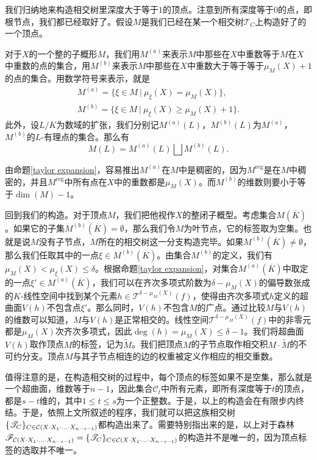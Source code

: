 我们归纳地来构造相交树里深度大于等于$1$的顶点。注意到所有深度等于$0$的点，即根节点，我们都已经取好了。假设$M$是我们已经在某一个相交树$\mathscr T_C$上构造好了的一个顶点。

对于$X$的一个整的子概形$M$，我们用$M^{(a)}$来表示$M$中那些在$X$中重数等于$M$在$X$中重数的点的集合，用$M^{(b)}$来表示$M$中那些在$X$中重数大于等于等于$\mu_M(X)+1$的点的集合。用数学符号来表示，就是
\begin{gather}
M^{(a)} = \{ \xi\in M \ |\ \mu_{\xi}(X) = \mu_{M}(X) \} ,\\
M^{(b)} = \{ \xi\in M \ |\ \mu_{\xi}(X) \geqslant \mu_{M}(X)+1 \}.
\end{gather}
此外，设$L/K$为数域的扩张，我们分别记$M^{(a)}(L)$，$M^{(b)}(L)$为$M^{(a)}$，$M^{(b)}$的$L$-有理点的集合。那么有
\begin{equation}
M(L) = M^{(a)}(L)\bigsqcup M^{(b)}(L).
\end{equation}

由命题\ref{taylor expansion}，容易推出$M^{(a)}$在$M$中是稠密的，因为$M^\mathrm{reg}$是在$M$中稠密的，并且$M^\mathrm{reg}$中所有点在$X$中的重数都是$\mu_M(X)$。而$M^{(b)}$的维数则要小于等于$\dim (M)-1$。

回到我们的构造。对于顶点$M$，我们把他视作$X$的整闭子概型。考虑集合$M(\overline K)$。如果它的子集$M^{(b)}(\overline K)=\emptyset$，那么我们令$M$为叶节点，它的标签取为空集。也就是说$M$没有子节点，$M$所在的相交树这一分支构造完毕。如果$M^{(b)}(\overline K)\neq\emptyset$，那么我们任取其中的一点$\xi \in M^{(b)}(\overline K)$。由集合$M^{(b)}$的定义，我们有$\mu_M(X) < \mu_{\xi}(X) \leqslant \delta$。根据命题\ref{taylor expansion}，对集合$M^{(a)}(\overline K)$中取定的一点$\xi'\in M^{(a)}(\overline K)$，我们可以在齐次多项式阶数为$\delta-\mu_M(X)$的偏导数张成的$K$-线性空间中找到某个元素$h \in \mathcal{T}^{\delta-\mu_M(X)}(f)$，使得由齐次多项式$h$定义的超曲面$V(h)$不包含点$\xi'$。那么同时，$V(h)$不包含$M$的广点。通过比较$M$与$V(h)$的维数可以知道，$M$与$V(h)$是正常相交的。线性空间$\mathcal{T}^{\delta-\mu_M(X)}(f)$中的非零元都是$\mu_M(X)$次齐次多项式，因此$\deg(h) = \mu_M(X) \leqslant \delta-1$。我们将超曲面$V(h)$取作顶点$M$的标签，记为$\widetilde{M}$。我们把顶点$M$的子节点取作相交积$M\cdot\widetilde{M}$的不可约分支。顶点$M$与其子节点相连的边的权重被定义作相应的相交重数。

值得注意的是，在构造相交树的过程中，每个顶点的标签如果不是空集，那么就是一个超曲面，维数等于$n-1$，因此集合$\mathcal{C}_t$中所有元素，即所有深度等于$t$的顶点，都是$s-t$维的，其中$1\leqslant t\leqslant s$为一个正整数。于是，以上的构造会在有限步内终结。于是，依照上文所叙述的程序，我们就可以把这族相交树$\{\mathscr T_C\}_{C\in\mathcal C(X\cdot X_{1}\cdot\ldots\cdot X_{n-s-1})}$都构造出来了。需要特别指出来的是，以上对于森林$\mathscr{F}_{\mathcal C(X\cdot X_{1}\cdot\ldots\cdot X_{n-s-1})} = \{\mathscr T_C\}_{C\in\mathcal C(X\cdot X_{1}\cdot\ldots\cdot X_{n-s-1})}$的构造并不是唯一的，因为顶点标签的选取并不唯一。

